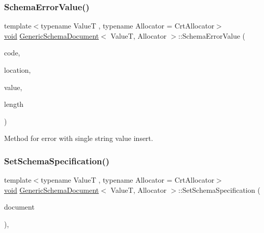 \subsubsection{\texorpdfstring{Schema\+Error\+Value()}{SchemaErrorValue()}}
{\footnotesize\ttfamily template$<$typename ValueT , typename Allocator  = Crt\+Allocator$>$ \\
\hyperlink{imgui__impl__opengl3__loader_8h_ac668e7cffd9e2e9cfee428b9b2f34fa7}{void} \hyperlink{classGenericSchemaDocument}{Generic\+Schema\+Document}$<$ ValueT, Allocator $>$\+::Schema\+Error\+Value (\begin{DoxyParamCaption}\item[{const \hyperlink{group__RAPIDJSON__ERRORS_ga64f496d2cee8c9673f3105ec6008f290}{Schema\+Error\+Code}}]{code,  }\item[{const \hyperlink{classGenericSchemaDocument_aeb62f562d4dc024402b00f97cbcef747}{Pointer\+Type} \&}]{location,  }\item[{const \hyperlink{classGenericSchemaDocument_ab1dec56a78b29649eb8e4b85b101ec7c}{Ch} $\ast$}]{value,  }\item[{\hyperlink{rapidjson_8h_a5ed6e6e67250fadbd041127e6386dcb5}{Size\+Type}}]{length }\end{DoxyParamCaption})\hspace{0.3cm}{\ttfamily [inline]}}



Method for error with single string value insert. 

\mbox{\label{classGenericSchemaDocument_a4af54b9334ca195cb5f8de1d8aae9ade}} 
\subsubsection{\texorpdfstring{Set\+Schema\+Specification()}{SetSchemaSpecification()}}
{\footnotesize\ttfamily template$<$typename ValueT , typename Allocator  = Crt\+Allocator$>$ \\
\hyperlink{imgui__impl__opengl3__loader_8h_ac668e7cffd9e2e9cfee428b9b2f34fa7}{void} \hyperlink{classGenericSchemaDocument}{Generic\+Schema\+Document}$<$ ValueT, Allocator $>$\+::Set\+Schema\+Specification (\begin{DoxyParamCaption}\item[{const \hyperlink{classGenericSchemaDocument_ae246f1b6573a5a8a2c0d73d4eb64d53a}{Value\+Type} \&}]{document }\end{DoxyParamCaption})\hspace{0.3cm}{\ttfamily [inline]}, {\ttfamily [private]}}



